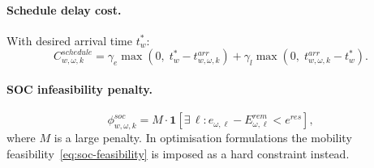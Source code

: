 \paragraph{Schedule delay cost.}
With desired arrival time $t^*_w$:
\begin{equation}
  C^{schedule}_{w,\omega,k}
  = \gamma_e \max(0,\; t^*_w - t^{arr}_{w,\omega,k})
  + \gamma_l \max(0,\; t^{arr}_{w,\omega,k} - t^*_w).
  \label{eq:schedule-cost}
\end{equation}

\paragraph{SOC infeasibility penalty.}
\begin{equation}
  \phi^{soc}_{w,\omega,k}
  = M \cdot \mathbf{1}\!\left[
      \exists\, \ell : e_{\omega,\ell} - E^{rem}_{\omega,\ell} < e^{res}
    \right],
  \label{eq:soc-penalty}
\end{equation}
where $M$ is a large penalty.  In optimisation formulations the
mobility feasibility~\eqref{eq:soc-feasibility} is imposed as a
hard constraint instead.


